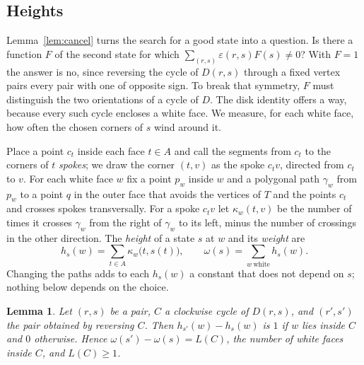 \documentclass[10pt]{amsart}
\numberwithin{equation}{section}
\newtheorem{lemma}[equation]{Lemma}
\theoremstyle{definition}
\theoremstyle{remark}
\newcommand{\T}{T}
\newcommand{\eps}{\varepsilon}
\newcommand{\Dc}{D}
\begin{document}
\subsection*{Heights}
Lemma~\ref{lem:cancel} turns the search for a good state into a question. Is there a function $F$ of the second state for which $\sum_{(r,s)}\eps(r,s)F(s)\neq0$?
With $F=1$ the answer is no, since reversing the cycle of $\Dc(r,s)$ through a fixed vertex pairs every pair with one of opposite sign.
To break that symmetry, $F$ must distinguish the two orientations of a cycle of $\Dc$.
The disk identity offers a way, because every such cycle encloses a white face.
We measure, for each white face, how often the chosen corners of $s$ wind around it.

Place a point $c_t$ inside each face $t\in A$ and call the segments from $c_t$ to the corners of $t$ \emph{spokes}; we draw the corner $(t,v)$ as the spoke $c_t v$, directed from $c_t$ to $v$.
For each white face $w$ fix a point $p_w$ inside $w$ and a polygonal path $\gamma_w$ from $p_w$ to a point $q$ in the outer face that avoids the vertices of $\T$ and the points $c_t$ and crosses spokes transversally.
For a spoke $c_t v$ let $\kappa_w(t,v)$ be the number of times it crosses $\gamma_w$ from the right of $\gamma_w$ to its left, minus the number of crossings in the other direction.
The \emph{height} of a state $s$ at $w$ and its \emph{weight} are
\[
h_s(w)=\sum_{t\in A}\kappa_w\bigl(t,s(t)\bigr),\qquad \omega(s)=\sum_{w\ \text{white}}h_s(w).
\]
Changing the paths adds to each $h_s(w)$ a constant that does not depend on $s$; nothing below depends on the choice.

\begin{lemma}\label{lem:height}
Let $(r,s)$ be a pair, $C$ a clockwise cycle of $\Dc(r,s)$, and $(r',s')$ the pair obtained by reversing $C$.
Then $h_{s'}(w)-h_s(w)$ is $1$ if $w$ lies inside $C$ and $0$ otherwise.
Hence $\omega(s')-\omega(s)=L(C)$, the number of white faces inside $C$, and $L(C)\ge1$.
\end{lemma}
\end{document}
